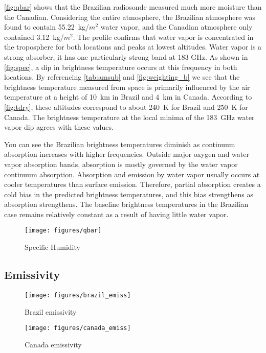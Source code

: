 \documentclass[twocol]{ametsoc}
\begin{document}
\autoref{fig:qbar} shows that the Brazilian radiosonde measured much more moisture than the Canadian.
Considering the entire atmosphere, the Brazilian atmosphere was found to contain 55.22~kg/$m^2$ water vapor, and the Canadian atmosphere only contained 3.12~kg/$m^2$.
The profile confirms that water vapor is concentrated in the troposphere for both locations and peaks at lowest altitudes.
Water vapor is a strong absorber, it has one particularly strong band at 183 GHz.
As shown in \autoref{fig:spec}, a dip in brightness temperature occurs at this frequency in both locations.
By referencing \autoref{tab:amsub} and \autoref{fig:weighting_b} we see that the brightness temperature measured from space is primarily influenced by the air temperature at a height of 10~km in Brazil and 4~km in Canada.
According to \autoref{fig:tdry}, these altitudes correspond to about 240~K for Brazil and 250~K for Canada.
The brightness temperature at the local minima of the 183~GHz water vapor dip agrees with these values.


You can see the Brazilian brightness temperatures diminish as continuum absorption increases with higher frequencies.
Outside major oxygen and water vapor absorption bands, absorption is mostly governed by the water vapor continuum absorption.
Absorption and emission by water vapor usually occurs at cooler temperatures than surface emission.
Therefore, partial absorption creates a cold bias in the predicted brightness temperatures, and this bias strengthens as absorption strengthens.
The baseline brightness temperatures in the Brazilian case remains relatively constant as a result of having little water vapor.

\begin{figure}
	\centering
	\texttt{[image: figures/qbar]}
	\caption{Specific Humidity}
	\label{fig:qbar}
\end{figure}

\subsection{Emissivity}


\begin{figure}
	\centering
	\texttt{[image: figures/brazil\_emiss]}
	\caption{Brazil emissivity}
	\label{fig:bemiss}
\end{figure}


\begin{figure}
	\centering
	\texttt{[image: figures/canada\_emiss]}
	\caption{Canada emissivity}
	\label{fig:cemiss}
\end{figure}
\end{document}
